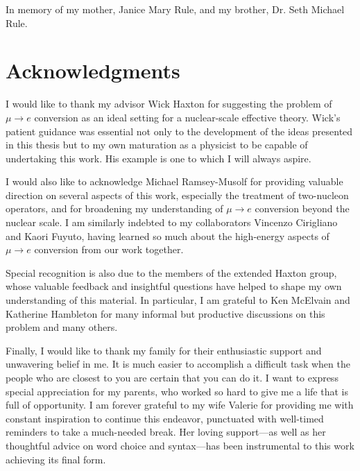 \documentclass[12pt,letterpaper]{book}
\renewcommand{\headrulewidth}{0pt}
\begin{document}
\frontmatter
\vspace*{10cm}
In memory of my mother, Janice Mary Rule, and my brother, Dr. Seth Michael Rule.
\cleardoublepage
{}
\tableofcontents
\cleardoublepage
{}
\listoffigures
\cleardoublepage
{}
\listoftables
\chapter*{\centering Acknowledgments}
I would like to thank my advisor Wick Haxton for suggesting the problem of $\mu\rightarrow e$ conversion as an ideal setting for a nuclear-scale effective theory. Wick's patient guidance was essential not only to the development of the ideas presented in this thesis but to my own maturation as a physicist to be capable of undertaking this work. His example is one to which I will always aspire.

I would also like to acknowledge Michael Ramsey-Musolf for providing valuable direction on several aspects of this work, especially the treatment of two-nucleon operators, and for broadening my understanding of $\mu\rightarrow e$ conversion beyond the nuclear scale. I am similarly indebted to my collaborators Vincenzo Cirigliano and Kaori Fuyuto, having learned so much about the high-energy aspects of $\mu\rightarrow e$ conversion from our work together. 

Special recognition is also due to the members of the extended Haxton group, whose valuable feedback and insightful questions have helped to shape my own understanding of this material. In particular, I am grateful to Ken McElvain and Katherine Hambleton for many informal but productive discussions on this problem and many others.  

Finally, I would like to thank my family for their enthusiastic support and unwavering belief in me. It is much easier to accomplish a difficult task when the people who are closest to you are certain that you can do it. I want to express special appreciation for my parents, who worked so hard to give me a life that is full of opportunity. I am forever grateful to my wife Valerie for providing me with constant inspiration to continue this endeavor, punctuated with well-timed reminders to take a much-needed break. Her loving support---as well as her thoughtful advice on word choice and syntax---has been instrumental to this work achieving its final form.
\mainmatter
\fancyhead[L]{\leftmark}
\end{document}

